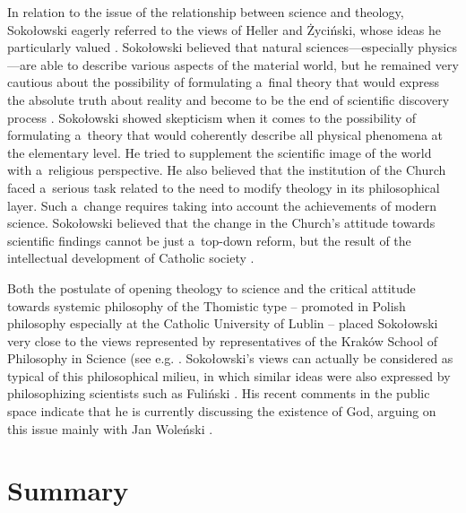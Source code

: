 In relation to the issue of the relationship between science and theology, Sokołowski eagerly referred to the views of Heller and Życiński, whose ideas he particularly valued 
\parencites[see,][]{}[][p.187]{}. %
 Sokołowski believed that natural sciences---especially physics---are able to describe various aspects of the material world, but he remained very cautious about the possibility of formulating a~final theory that would express the absolute truth about reality and become to be the end of scientific discovery process 
\parencite[][]{}. %
 Sokołowski showed skepticism when it comes to the possibility of formulating a~theory that would coherently describe all physical phenomena at the elementary level. He tried to supplement the scientific image of the world with a~religious perspective. He also believed that the institution of the Church faced a~serious task related to the need to modify theology in its philosophical layer. Such a~change requires taking into account the achievements of modern science. Sokołowski believed that the change in the Church's attitude towards scientific findings cannot be just a~top-down reform, but the result of the intellectual development of Catholic society 
\parencite[][p.123]{}.%




Both the postulate of opening theology to science and the critical attitude towards systemic philosophy of the Thomistic type -- promoted in Polish philosophy especially at the Catholic University of Lublin -- placed Sokołowski very close to the views represented by representatives of the Kraków School of Philosophy in Science (see e.g. 
\parencites[][pp.228–229]{Trombik2021Koncepcje}[][]{Trombik2022Teologia}. %
 Sokołowski's views can actually be considered as typical of this philosophical milieu, in which similar ideas were also expressed by philosophizing scientists such as Fuliński 
\parencite[][]{Trombik2023Andrzej}. %
 His recent comments in the public space indicate that he is currently discussing the existence of God, arguing on this issue mainly with Jan Woleński 
\parencite[][]{}.%




\section{Summary}

